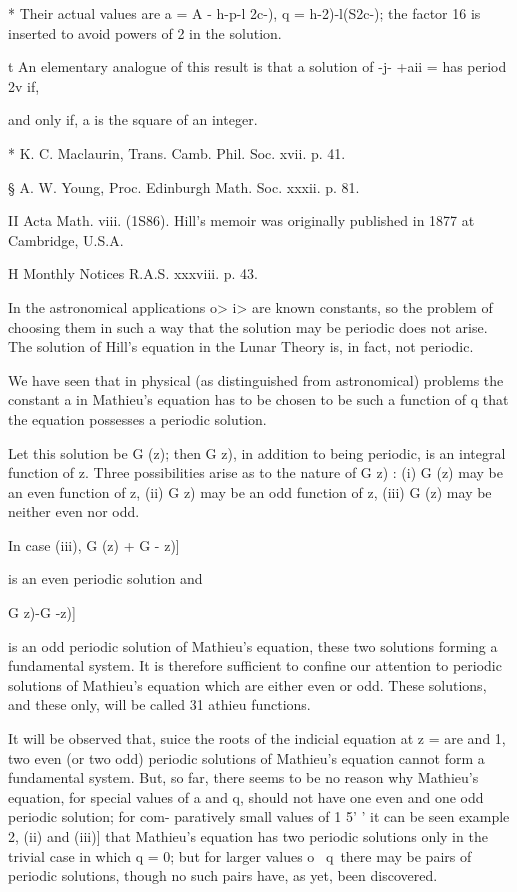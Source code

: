 * Their actual values are a = A - h-p-l 2c-), q = h-2)-l(S2c-); the
factor 16 is inserted to avoid powers of 2 in the solution.

t An elementary analogue of this result is that a solution of -j- +aii
= has period 2v if,

and only if, a is the square of an integer.

* K. C. Maclaurin, Trans. Camb. Phil. Soc. xvii. p. 41.

§ A. W. Young, Proc. Edinburgh Math. Soc. xxxii. p. 81.

II Acta Math. viii. (1S86). Hill's memoir was originally published in
1877 at Cambridge, U.S.A.

H Monthly Notices R.A.S. xxxviii. p. 43.

%
%

In the astronomical applications o> i>  are known constants, so the
problem of choosing them in such a way that the solution may be
periodic does not arise. The solution of Hill's equation in the Lunar
Theory is, in fact, not periodic.


We have seen that in physical (as distinguished from astronomical)
problems the constant a in Mathieu's equation has to be chosen to be
such a function of q that the equation possesses a periodic solution.

Let this solution be G (z); then G z), in addition to being periodic,
is an integral function of z. Three possibilities arise as to the
nature of G z) : (i) G (z) may be an even function of z, (ii) G z) may
be an odd function of z, (iii) G (z) may be neither even nor odd.

In case (iii), G (z) + G - z)]

is an even periodic solution and

  G z)-G -z)]

is an odd periodic solution of Mathieu's equation, these two solutions
forming a fundamental system. It is therefore sufficient to confine
our attention to periodic solutions of Mathieu's equation which are
either even or odd. These solutions, and these only, will be called 31
athieu functions.

It will be observed that, suice the roots of the indicial equation at
z = are and 1, two even (or two odd) periodic solutions of Mathieu's
equation cannot form a fundamental system. But, so far, there seems to
be no reason why Mathieu's equation, for special values of a and q,
should not have one even and one odd periodic solution; for com-
paratively small values of 1 5' ' it can be seen  example 2,
(ii) and (iii)] that Mathieu's equation has two periodic solutions
only in the trivial case in which q = 0; but for larger values o \ q\
there may be pairs of periodic solutions, though no such pairs have,
as yet, been discovered.

